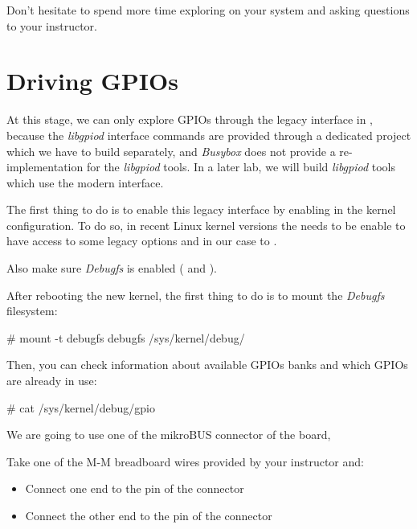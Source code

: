 Don't hesitate to spend more time exploring  on your system
and asking questions to your instructor.

\section{Driving GPIOs}

At this stage, we can only explore GPIOs through the legacy interface
in , because the {\em libgpiod} interface
commands are provided through a dedicated project which we have to
build separately, and {\em Busybox} does not provide a
re-implementation for the {\em libgpiod} tools. In a later lab, we
will build {\em libgpiod} tools which use the modern
 interface.

The first thing to do is to enable this legacy interface by enabling
 in the kernel configuration.
To do so, in recent Linux kernel versions the 
needs to be enable to have access to some legacy options and in our
case to .

Also make sure {\em Debugfs} is enabled ( and
).

After rebooting the new kernel, the first thing to do is to mount
the {\em Debugfs} filesystem:

\begin{bashinput}
# mount -t debugfs debugfs /sys/kernel/debug/
\end{bashinput}

Then, you can check information about available GPIOs banks and which
GPIOs are already in use:

\begin{bashinput}
# cat /sys/kernel/debug/gpio
\end{bashinput}

We are going to use one of the mikroBUS connector of the board,

Take one of the M-M breadboard wires provided by your instructor and:
\begin{itemize}
  \item Connect one end to the  pin of the  connector
  \item Connect the other end to the  pin of the  connector
\end{itemize}

